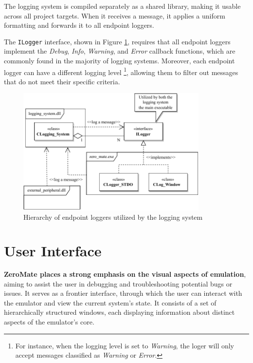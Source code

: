 \documentclass[english, ing, kiv, he, iso690numb, pdf]{fasthesis}
\begin{document}
	\newpage
	
	The logging system is compiled separately as a shared library, making it usable across all project targets. When it receives a message, it applies a uniform formatting and forwards it to all endpoint loggers. 
	
	The \texttt{ILogger} interface, shown in Figure \ref{Hierarchy of endpoint loggers utilized by the logging system}, requires that all endpoint loggers implement the \textit{Debug}, \textit{Info}, \textit{Warning}, and \textit{Error} callback functions, which are commonly found in the majority of logging systems. Moreover, each endpoint logger can have a different logging level \footnote{For instance, when the logging level is set to \textit{Warning}, the loger will only accept messages classified as \textit{Warning} or \textit{Error}.}, allowing them to filter out messages that do not meet their specific criteria.
	
	\begin{figure}[ht]
		\centering
		\includegraphics[width=0.85\textwidth]{img/diagrams/logging_system_2.pdf}
		\caption{Hierarchy of endpoint loggers utilized by the logging system}
		\label{Hierarchy of endpoint loggers utilized by the logging system}
	\end{figure}
	
	\section{User Interface} \label{User Interface}
	
	\textbf{ZeroMate places a strong emphasis on the visual aspects of emulation}, aiming to assist the user in debugging and troubleshooting potential bugs or issues. It serves as a frontier interface, through which the user can interact with the emulator and view the current system's state. It consists of a set of hierarchically structured windows, each displaying information about distinct aspects of the emulator's core.
	
\end{document}
